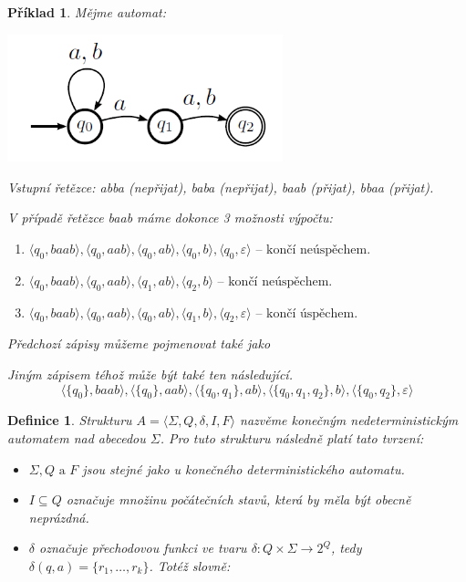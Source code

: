 \documentclass[10pt,a4paper]{article}
\theoremstyle{note}
\newtheorem{definice}{Definice}
\newtheorem{priklad}{Příklad}
\begin{document}
\begin{priklad}
Mějme automat:

\vspace*{40px}
\begin{center}
\includegraphics[width=8cm]{img/KDA-priklad3.png}
\end{center}

Vstupní řetězce: \textit{abba} (nepřijat), \textit{baba} (nepřijat), \textit{baab} (přijat), \textit{bbaa} (přijat).

V případě řetězce \textit{baab} máme dokonce 3 možnosti výpočtu:
\begin{enumerate}
\item
$\langle q_{0}, baab \rangle, \langle q_{0}, aab \rangle, \langle q_{0}, ab \rangle, \langle q_{0}, b \rangle, \langle q_{0}, \varepsilon \rangle \text{ -- končí neúspěchem.}$
\item
$\langle q_{0}, baab \rangle, \langle q_{0}, aab \rangle, \langle q_{1}, ab \rangle, \langle q_{2}, b \rangle \text{ -- končí neúspěchem.}$
\item
$\langle q_{0}, baab \rangle, \langle q_{0}, aab \rangle, \langle q_{0}, ab \rangle, \langle q_{1}, b \rangle, \langle q_{2}, \varepsilon \rangle \text{ -- končí úspěchem.}$ 
\end{enumerate}
Předchozí zápisy můžeme pojmenovat také jako 

Jiným zápisem téhož může být také ten následující.
$$
\langle \lbrace q_{0} \rbrace, baab \rangle, \langle \lbrace q_{0} \rbrace, aab \rangle, \langle \lbrace q_{0}, q_{1} \rbrace, ab \rangle,
\langle \lbrace q_{0}, q_{1}, q_{2} \rbrace, b \rangle, \langle \lbrace q_{0}, q_{2} \rbrace, \varepsilon \rangle
$$ 
\end{priklad}

\begin{definice}
Strukturu $A = \langle \Sigma, Q, \delta, I, F \rangle$ nazvěme \textit{konečným nedeterministickým automatem} nad abecedou $\Sigma$. Pro tuto strukturu následně platí tato tvrzení:
\begin{itemize}
\item
$\Sigma, Q \text{ a } F$ jsou stejné jako u konečného deterministického automatu.
\item
$I\subseteq Q$ označuje množinu počátečních stavů, která by měla být obecně neprázdná.
\item
$\delta$ označuje přechodovou funkci ve tvaru $\delta : Q \times \Sigma \rightarrow 2^{Q}$, tedy $\delta (q, a) = \lbrace r_{1}, \ldots, r_{k} \rbrace$. Totéž slovně: 
\end{itemize}
\end{definice}
\end{document}
